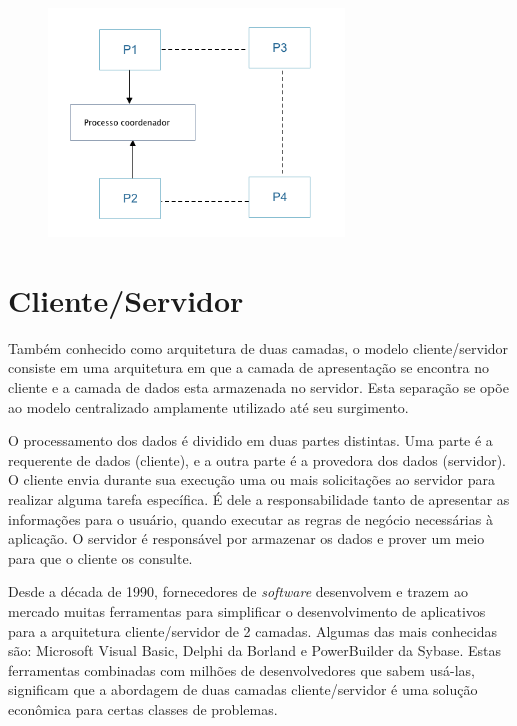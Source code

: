 \begin{figure}
    \centering
    \includegraphics[width=0.7\textwidth]{figuras/ipc.png}
    \label{fig:how-communication-works}
\end{figure}

\section{Cliente/Servidor}\label{sec:clientserver}

Também conhecido como arquitetura de duas camadas, o modelo cliente/servidor consiste em uma arquitetura em que a camada de apresentação se encontra no cliente e a camada de dados esta armazenada no servidor. Esta separação se opõe ao modelo centralizado amplamente utilizado até seu surgimento.

O processamento dos dados é dividido em duas partes distintas. Uma parte é a requerente de dados (cliente), e a outra parte é a provedora dos dados (servidor). O cliente envia durante sua execução uma ou mais solicitações ao servidor para realizar alguma tarefa específica. É dele a responsabilidade tanto de apresentar as informações para o usuário, quando executar as regras de negócio necessárias à aplicação. O servidor é responsável por armazenar os dados e prover um meio para que o cliente os consulte.

Desde a década de 1990, fornecedores de \textit{software} desenvolvem e trazem ao mercado muitas ferramentas para simplificar o desenvolvimento de aplicativos para a arquitetura cliente/servidor de 2 camadas. Algumas das mais conhecidas são: Microsoft Visual Basic, Delphi da Borland e PowerBuilder da Sybase. Estas ferramentas combinadas com milhões de desenvolvedores que sabem usá-las, significam que a abordagem de duas camadas cliente/servidor é uma solução econômica para certas classes de problemas.

